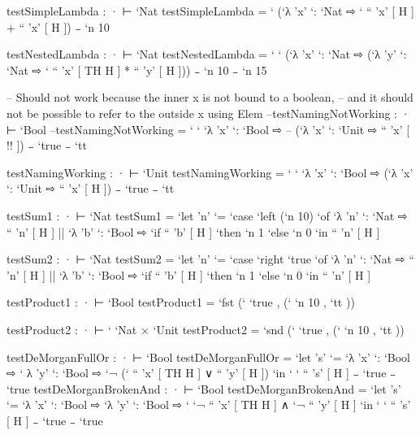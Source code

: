 \documentclass{article}
\begin{document}
\begin{code}
  testSimpleLambda : · ⊢ `Nat
  testSimpleLambda = ` (`λ 'x' `: `Nat ⇨ ` `` 'x' [ H ] + `` 'x' [ H ]) ₋ `n 10

  testNestedLambda : · ⊢ `Nat
  testNestedLambda = ` ` (`λ 'x' `: `Nat ⇨ 
                         (`λ 'y' `: `Nat ⇨ 
                         ` `` 'x' [ TH H ] * `` 'y' [ H ])) ₋ `n 10 ₋ `n 15

  -- Should not work because the inner x is not bound to a boolean, 
  -- and it should not be possible to refer to the outside x using Elem
  --testNamingNotWorking : · ⊢ `Bool
  --testNamingNotWorking = ` ` `λ 'x' `: `Bool ⇨ 
  --                      (`λ 'x' `: `Unit ⇨ `` 'x' [ {!!} ]) ₋ `true ₋ `tt

  testNamingWorking : · ⊢ `Unit
  testNamingWorking = ` ` `λ 'x' `: `Bool ⇨ 
                      (`λ 'x' `: `Unit ⇨ `` 'x' [ H ]) ₋ `true ₋ `tt

  testSum1 : · ⊢ `Nat
  testSum1 = `let 'n' `= `case `left (`n 10) `of 
                                `λ 'n' `: `Nat ⇨ `` 'n' [ H ]
                             || `λ 'b' `: `Bool ⇨ `if `` 'b' [ H ]
                                                  `then `n 1 
                                                  `else `n 0 
             `in `` 'n' [ H ]  

  testSum2 : · ⊢ `Nat
  testSum2 = `let 'n' `= `case `right `true `of
                                `λ 'n' `: `Nat ⇨ `` 'n' [ H ]
                             || `λ 'b' `: `Bool ⇨ `if `` 'b' [ H ] 
                                                  `then `n 1 
                                                  `else `n 0
             `in `` 'n' [ H ]  

  testProduct1 : · ⊢ `Bool
  testProduct1 = `fst (` `true , (` `n 10 , `tt ))

  testProduct2 : · ⊢ ` `Nat × `Unit
  testProduct2 = `snd (` `true , (` `n 10 , `tt ))

  testDeMorganFullOr : · ⊢ `Bool
  testDeMorganFullOr = `let 's' `= `λ 'x' `: `Bool ⇨ `
                                    λ 'y' `: `Bool ⇨ 
                                      `¬ (` `` 'x' [ TH H ] ∨ `` 'y' [ H ])
                       `in ` ` `` 's' [ H ] ₋ `true ₋ `true
  testDeMorganBrokenAnd : · ⊢ `Bool
  testDeMorganBrokenAnd = `let 's' `= `λ 'x' `: `Bool ⇨ 
                                      `λ 'y' `: `Bool ⇨
                                      ` `¬ `` 'x' [ TH H ] ∧ `¬ `` 'y' [ H ]
                          `in ` ` `` 's' [ H ] ₋ `true ₋ `true 
\end{code}



\end{document}
